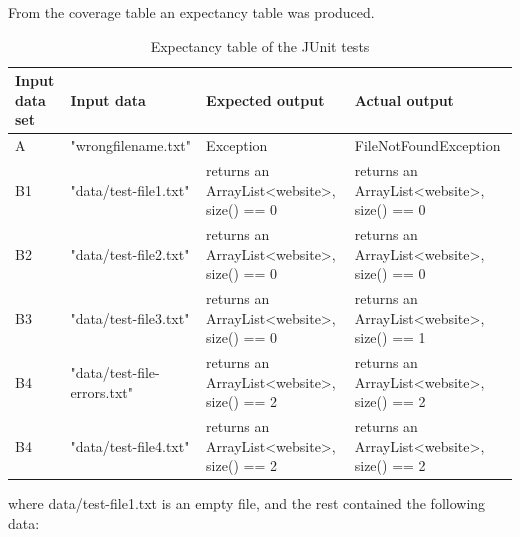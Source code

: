 From the coverage table an expectancy table was produced.

\begin{table}[!h]
    \caption{Expectancy table of the JUnit tests}
    \begin{tabular}{|l|p{85pt}|p{100pt}|p{100pt}|}
        \hline
        \textbf{Input data set} & \textbf{Input data} & \textbf{Expected output} & \textbf{Actual output} \\ \hline
        A & "wrongfilename.txt" & Exception & FileNotFoundException \\ \hline
        B1 & "data/test-file1.txt" & returns an ArrayList<website>, size() == 0 & returns an ArrayList<website>, size() == 0 \\ \hline
        B2 & "data/test-file2.txt" & returns an ArrayList<website>, size() == 0 & returns an ArrayList<website>, size() == 0 \\ \hline
        B3 & "data/test-file3.txt" & returns an ArrayList<website>, size() == 0 & returns an ArrayList<website>, size() == 1 \\ \hline
        B4 & "data/test-file-errors.txt" & returns an ArrayList<website>, size() == 2 & returns an ArrayList<website>, size() == 2 \\ \hline
        B4 & "data/test-file4.txt" & returns an ArrayList<website>, size() == 2 & returns an ArrayList<website>, size() == 2 \\ \hline
    \end{tabular}
    \label{FH:resuts}
\end{table}

where data/test-file1.txt is an empty file, and the rest contained the following data:


